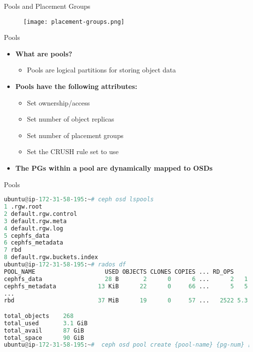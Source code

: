 \begin{frame}{Pools and Placement Groups}
    \begin{figure}[htpb]
        \centering
        \texttt{[image: placement-groups.png]}
    \end{figure}
\end{frame}

\begin{frame}{Pools}
    \begin{itemize}
        \item \textbf{What are pools?}
            \begin{itemize}
                \item Pools are logical partitions for storing object data
            \end{itemize}
        \item \textbf{Pools have the following attributes:}
            \begin{itemize}
                \item Set ownership/access
                \item Set number of object replicas
                \item Set number of placement groups
                \item Set the CRUSH rule set to use
            \end{itemize}
        \item \textbf{The PGs within a pool are dynamically mapped to OSDs}
    \end{itemize}
\end{frame}

\begin{frame}[fragile]{Pools}
\begin{lstlisting}[language=python]
ubuntu@ip-172-31-58-195:~# ceph osd lspools
1 .rgw.root
2 default.rgw.control
3 default.rgw.meta
4 default.rgw.log
5 cephfs_data
6 cephfs_metadata
7 rbd
8 default.rgw.buckets.index
ubuntu@ip-172-31-58-195:~# rados df
POOL_NAME                    USED OBJECTS CLONES COPIES ... RD_OPS      RD WR_OPS     WR
cephfs_data                  28 B       2      0      6 ...      2   1 KiB      2  2 KiB
cephfs_metadata            13 KiB      22      0     66 ...      5   5 KiB     91 46 KiB
...
rbd                        37 MiB      19      0     57 ...   2522 5.3 MiB   1313 81 MiB

total_objects    268
total_used       3.1 GiB
total_avail      87 GiB
total_space      90 GiB 
ubuntu@ip-172-31-58-195:~#  ceph osd pool create {pool-name} {pg-num} [{pgp-num}]
\end{lstlisting}
\end{frame}

